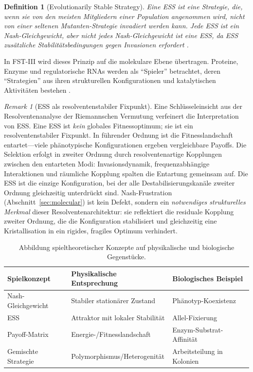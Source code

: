 \documentclass[12pt,a4paper]{article}
\newtheorem{definition}{Definition}
\theoremstyle{remark}
\newtheorem{remark}{Remark}
\begin{document}
\begin{definition}[Evolutionarily Stable Strategy]
Eine ESS ist eine Strategie, die, wenn sie von den meisten Mitgliedern einer Population angenommen wird, nicht von einer seltenen Mutanten-Strategie invadiert werden kann. Jede ESS ist ein Nash-Gleichgewicht, aber nicht jedes Nash-Gleichgewicht ist eine ESS, da ESS zus\"atzliche Stabilit\"atsbedingungen gegen Invasionen erfordert \citep{MaynardSmith1982}.
\end{definition}

In FST-III wird dieses Prinzip auf die molekulare Ebene \"ubertragen. Proteine, Enzyme und regulatorische RNAs werden als ``Spieler'' betrachtet, deren ``Strategien'' aus ihren strukturellen Konfigurationen und katalytischen Aktivit\"aten bestehen \citep{GameBiochemistry}.

\begin{remark}[ESS als resolventenstabiler Fixpunkt]
\label{rem:ess-resolvent}
Eine Schl\"usseleinsicht aus der Resolventenanalyse der Riemannschen Vermutung \citep{FST-RH2} verfeinert die Interpretation von ESS. Eine ESS ist \emph{kein} globales Fitnessoptimum; sie ist ein resolventenstabiler Fixpunkt. In f\"uhrender Ordnung ist die Fitnesslandschaft entartet---viele ph\"anotypische Konfigurationen ergeben vergleichbare Payoffs. Die Selektion erfolgt in zweiter Ordnung durch resolventenartige Kopplungen zwischen den entarteten Modi: Invasionsdynamik, frequenzabh\"angige Interaktionen und r\"aumliche Kopplung spalten die Entartung gemeinsam auf. Die ESS ist die einzige Konfiguration, bei der alle Destabilisierungskan\"ale zweiter Ordnung gleichzeitig unterdr\"uckt sind. Nash-Frustration (Abschnitt~\ref{sec:molecular}) ist kein Defekt, sondern ein \emph{notwendiges strukturelles Merkmal} dieser Resolventenarchitektur: sie reflektiert die residuale Kopplung zweiter Ordnung, die die Konfiguration stabilisiert und gleichzeitig eine Kristallisation in ein rigides, fragiles Optimum verhindert.
\end{remark}

\begin{table}[ht]
\centering
\caption{Abbildung spieltheoretischer Konzepte auf physikalische und biologische Gegenst\"ucke.}
\label{tab:game-biology-mapping}
\begin{tabular}{lll}
\toprule
\textbf{Spielkonzept} & \textbf{Physikalische Entsprechung} & \textbf{Biologisches Beispiel} \\
\midrule
Nash-Gleichgewicht & Stabiler station\"arer Zustand & Ph\"anotyp-Koexistenz \\
ESS & Attraktor mit lokaler Stabilit\"at & Allel-Fixierung \\
Payoff-Matrix & Energie-/Fitnesslandschaft & Enzym-Substrat-Affinit\"at \\
Gemischte Strategie & Polymorphismus/Heterogenit\"at & Arbeitsteilung in Kolonien \\
\bottomrule
\end{tabular}
\end{table}
\end{document}
